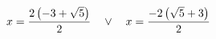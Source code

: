 \documentclass[preview]{standalone}
\begin{document}
\begin{align*}
\special{dvisvgm:raw <g id='unique000'>}x=\frac{2 \left(-3 + \sqrt{5}\right)}{2} \quad \lor \quad x=\frac{- 2 \left(\sqrt{5} + 3\right)}{2}\special{dvisvgm:raw </g>}
\end{align*}
\end{document}
